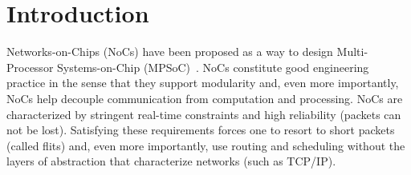 \documentclass[a4paper,12pt]{article}
\newenvironment{proof sketch}[1]{\noindent {\emph{Proof sketch of #1:}}}{\hfill \qed}
\begin{document}
\begin{comment}
\begin{abstract}
  We present algorithms that design NoCs with guaranteed quality of service.  Given
  an NoC topology, a mapping of tasks to processing elements, and traffic
  requirements between the tasks, the algorithm computes the widths of the
  interconnections in the network, a detailed static routing, and a periodic
  scheduling. %

  The algorithm works in three stages. First, a fractional Multi-Commodity Flow (MCF)
  problem is solved (using standard linear programming solvers). The MCF solution
  determines the widths of the interconnections as well as the routes of the flits.
  Second, the MCF solution is rounded to a periodic TDM schedule. Third, the periodic
  schedule is translated to local periodic control in each switch and network
  interface.

  Our algorithm is applicable to large instances since every stage is efficient.  The
  algorithm supports arbitrary topologies and traffic patterns.  Routing along
  multiple paths is allowed in order to increase utilization and decrease latency.


  The NoC architecture does not require headers, control messages, acknowledgments.
  Reduces overheads.

  We implemented the algorithm and tested it with the MCSL benchmark. Experiments
  demonstrate that our solution is stable and satisfies all the real-time constraints.
\end{abstract}
\end{comment}


\section{Introduction}
Networks-on-Chips (NoCs) have been proposed as a way to design Multi-Processor
Systems-on-Chip (MPSoC)~\cite{dally2001route,seitz1990let}. NoCs constitute good
engineering practice in the sense that they support modularity and, even more
importantly, NoCs help decouple communication from computation and processing.  NoCs
are characterized by stringent real-time constraints and high reliability (packets can not
be lost). Satisfying these requirements forces one to resort to short packets (called
flits) and, even more importantly, use routing and scheduling without the layers of
abstraction that characterize networks (such as TCP/IP).
\end{document}
